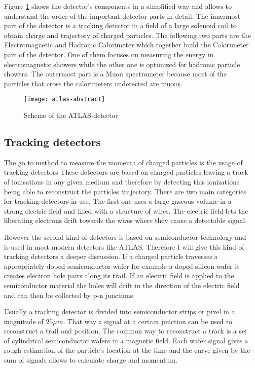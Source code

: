 Figure \ref{fig:atlas_sketch} shows the detector's components in a simplified way and allows to understand the order of the important detector parts in detail. The innermost part of the detector is a tracking detector in a field of a large solenoid coil to obtain charge and trajectory of charged particles.
The following two parts are the Electromagnetic and Hadronic Calorimeter which together build the Calorimeter part of the detector. One of them focuses on measuring the energy in electromagnetic showers while the other one is optimized for hadronic particle showers. The outermost part is a Muon spectrometer because most of the particles that cross the calorimeters undetected are muons.


\begin{figure}[h]
  \centering
  \texttt{[image: atlas-abstract]}
  \caption[Sketch of the transversal section of the ATLAS detector]{Scheme of the ATLAS-detector \cite{atlasfigures}}
  \label{fig:atlas_sketch}
\end{figure}

\subsection{Tracking detectors}

The go to method to measure the momenta of charged particles is the usage of tracking detectors
These detectors are based on charged particles leaving a track of ionisations in any given medium and therefore by detecting this ionizations being able to reconstruct the particles trajectory.
There are two main categories for tracking detectors in use. The first one uses a large gaseous volume in a strong electric field and filled with a structure of wires. The electric field lets the liberating electrons drift towards the wires where they cause a detectable signal.

However the second kind of detectors is based on semiconductor technology and is used in most modern detectors like ATLAS. Therefore I will give this kind of tracking detectors a deeper discussion.
If a charged particle traverses a appropriately doped semiconductor wafer for example a doped silicon wafer it creates electron hole pairs along its trail. If an electric field is applied to the semiconductor material the holes will drift in the direction of the electric field and can then be collected by p-n junctions.

Usually a tracking detector is divided into semiconductor strips or pixel in a magnitude of $25 \mu m$. That way a signal at a certain junction can be used to reconstruct a trail and position. The common way to reconstruct a track is a set of cylindrical semiconductor wafers in a magnetic field. Each wafer signal gives a rough estimation of the particle's location at the time and the curve given by the sum of signals allows to calculate charge and momentum.

